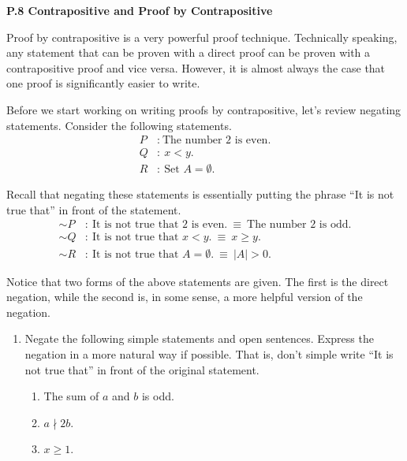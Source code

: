 \documentclass[12 pt]{article}
\newcommand{\ndivides}{\! \nmid \!}
\theoremstyle{definition}
\theoremstyle{plain}
\theoremstyle{mytheorem}
\theoremstyle{myexample}
\theoremstyle{mydefinition}
\begin{document}
\begin{center}
\textbf{P.8 Contrapositive and Proof by Contrapositive}
\end{center}

Proof by contrapositive is a very powerful proof technique.  Technically speaking, any statement that can be proven with a direct proof can be proven with a contrapositive proof and vice versa.  However, it is almost always the case that one proof is significantly easier to write. 

\begin{center}
\end{center}

\noindent Before we start working on writing proofs by contrapositive, let's review negating statements.  Consider the following statements.
	\begin{align*}
	P &: \ \mbox{The number 2 is even.}\\
	Q &: \ \mbox{$x<y$.}\\
	R &: \ \mbox{Set $A= \emptyset$.}
	\end{align*}
	
Recall that negating these statements is essentially putting the phrase ``It is not true that'' in front of the statement.
	\begin{align*}
	\sim P &: \ \mbox{It is not true that 2 is even.} \ \equiv \ \mbox{The number 2 is odd.}\\
	\sim Q &: \ \mbox{It is not true that $x<y$.} \ \equiv \ \mbox{$x \geq y$.}\\
	\sim R &: \ \mbox{It is not true that $A = \emptyset$.} \ \equiv \ \mbox{$|A|>0$.}
	\end{align*}

Notice that two forms of the above statements are given.  The first is the direct negation, while the second is, in some sense, a more helpful version of the negation.

\begin{enumerate}
	\item Negate the following simple statements and open sentences.  Express the negation in a more natural way if possible.  That is, don't simple write ``It is not true that'' in front of the original statement.
	\begin{enumerate} \itemsep.5in
	\item The sum of $a$ and $b$ is odd.
	\item $a \ndivides 2b$.
	\item $x \geq 1$.
	\vspace{.5in}
	\end{enumerate}
\end{enumerate}
\end{document}
